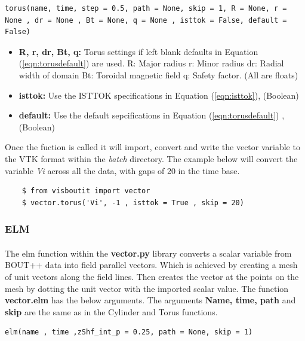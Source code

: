 \documentclass[12pt,a4paper]{article}
\begin{document}
\begin{verbatim}
torus(name, time, step = 0.5, path = None, skip = 1, R = None, r = None , dr = None , Bt = None, q = None , isttok = False, default = False)
\end{verbatim}

\begin{itemize}
	\item{\textbf{R, r, dr, Bt, q:} Torus settings if left blank defaults in Equation (\ref{eqn:torusdefault}) are used.
		R: Major radius
		r: Minor radius
		dr: Radial width of domain
		Bt: Toroidal magnetic field
		q: Safety factor. (All are floats)}
	\item{\textbf{isttok:} Use the ISTTOK specifications in Equation (\ref{eqn:isttok}), (Boolean)}
	\item{\textbf{default:} Use the default sepcifications in Equation (\ref{eqn:torusdefault}) , (Boolean)}
\end{itemize}


Once the fuction is called it will import, convert and write the vector variable to the VTK format within the \textit{batch} directory. The example below will convert the variable \textit{Vi} across all the data, with gaps of 20 in the time base.

\begin{verbatim}
	$ from visboutit import vector
	$ vector.torus('Vi', -1 , isttok = True , skip = 20)
\end{verbatim} 

\subsubsection{ELM}
\paragraph{}
The elm function within the \textbf{vector.py} library converts a scalar variable from BOUT++ data into field parallel vectors. Which is achieved by creating a mesh of unit vectors along the field lines. Then creates the vector at the points on the mesh by dotting the unit vector with the imported scalar value. The function \textbf{vector.elm} has the below arguments. The arguments \textbf{Name, time, path} and \textbf{skip} are the same as in the Cylinder and Torus functions.

\begin{verbatim}
elm(name , time ,zShf_int_p = 0.25, path = None, skip = 1)
\end{verbatim}
\end{document}
